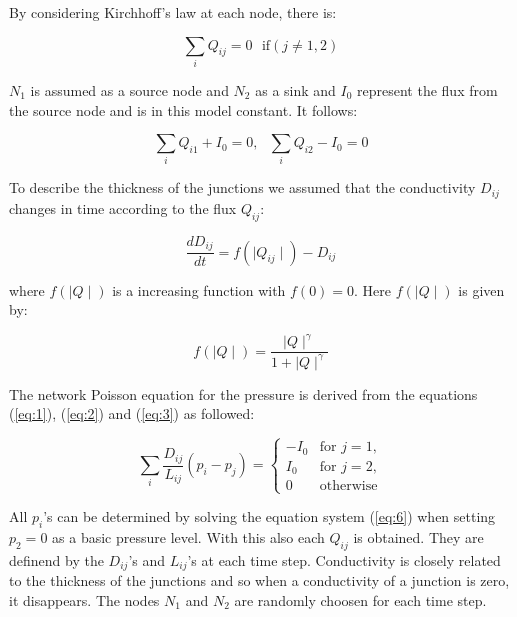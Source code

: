 \documentclass[11pt]{scrartcl}
\begin{document}
By considering Kirchhoff's law at each node, there is:

\begin{equation}
	\label{eq:2}
	\sum_{i} Q_{ij}=0 \,\,\,\, \mathrm{if} \left(j\ne 1,2\right)
\end{equation}

$N_1$ is assumed as a source node and $N_2$ as a sink and $I_0$ represent the flux from the source node and is in this model constant. It follows:

\begin{equation}
	\label{eq:3}
	\sum_{i} Q_{i1}+I_0=0, \,\,\,\, \sum_{i} Q_{i2}-I_0=0
\end{equation}

To describe the thickness of the junctions we assumed that the conductivity $D_{ij}$ changes in time according to the flux $Q_{ij}$:

\begin{equation}
	\label{eq:4}
	\frac{dD_{ij}}{dt}=f\left(\mid Q_{ij} \mid \right)-D_{ij}
\end{equation}

where $f\left(\mid Q \mid \right)$ is a increasing function with $f(0)=0$. Here $f\left(\mid Q \mid \right)$ is given by:

\begin{equation}
	\label{eq:5}
	f\left(\mid Q \mid \right)=\frac{\mid Q \mid^\gamma }{1+\mid Q \mid^\gamma}
\end{equation}

The network Poisson equation for the pressure is derived from the equations (\ref{eq:1}), (\ref{eq:2}) and (\ref{eq:3}) as followed:

\begin{equation}
	\label{eq:6}
	\sum_{i} \frac{D_{ij}}{L_{ij}}\left(p_i-p_j\right)= \begin{cases}
										-I_0 & \mathrm{for}\,\, j=1,\\
										I_0 & \mathrm{for} \,\,j=2,\\
										0 & \mathrm{otherwise}
										\end{cases}
\end{equation}

All $p_i$'s can be determined by solving the equation system (\ref{eq:6}) when setting $p_2=0$ as a basic pressure level. With this also each $Q_{ij}$ is obtained. They are definend by the $D_{ij}$'s and $L_{ij}$'s  at each time step. Conductivity is closely related to the thickness of the junctions and so when a conductivity of a junction is zero, it disappears. The nodes $N_1$ and $N_2$ are randomly choosen for each time step.
\end{document}
